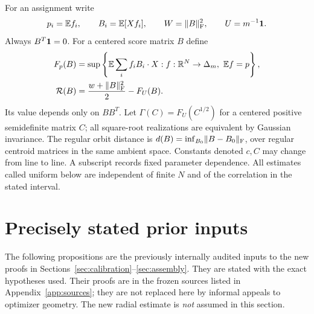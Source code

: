 For an assignment write
\begin{equation}\label{eq:assignment-data}
 p_i=\mathbb E f_i,\qquad B_i=\mathbb E[Xf_i],\qquad
 W=\lVert B\rVert_{\mathrm F}^2,\qquad U=m^{-1}\mathbf 1.
\end{equation}
Always $B^T\mathbf 1=0$. For a centered score matrix $B$ define
\begin{align}
 F_p(B)&=\sup\left\{\mathbb E\sum_i f_i B_i\cdot X:
                  f:\mathbb R^N\to\Delta_m,\ \mathbb E f=p\right\},\label{eq:dual-value}\\
 \mathcal R(B)&=\frac{w+\lVert B\rVert_{\mathrm F}^2}{2}-F_U(B).\label{eq:R-def}
\end{align}
Its value depends only on $BB^T$. Let
$\Gamma(C)=F_U(C^{1/2})$ for a centered positive semidefinite matrix
$C$; all square-root realizations are equivalent by Gaussian invariance.
The regular orbit distance is
$d(B)=\inf_{B_0}\lVert B-B_0\rVert_{\mathrm F}$, over regular centroid matrices
in the same ambient space. Constants denoted $c,C$ may change from line
to line. A subscript records fixed parameter dependence. All estimates
called uniform below are independent of finite $N$ and of the correlation
in the stated interval.

\section{Precisely stated prior inputs}\label{sec:inputs}
The following propositions are the previously internally audited inputs
to the new proofs in Sections~\ref{sec:calibration}--\ref{sec:assembly}.
They are stated with the exact hypotheses used. Their proofs are in the
frozen sources listed in Appendix~\ref{app:sources}; they are not replaced
here by informal appeals to optimizer geometry. The new radial estimate
is \emph{not} assumed in this section.

